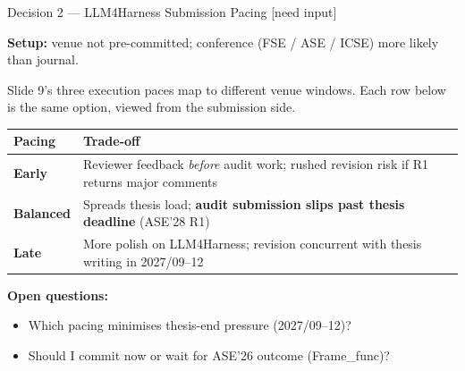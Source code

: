 \documentclass[aspectratio=169]{beamer}
\begin{document}
\begin{frame}{Decision 2 --- LLM4Harness Submission Pacing
\quad\textcolor{myred}{\small[need input]}}

\textbf{Setup:} venue not pre-committed; conference (FSE / ASE / ICSE) more likely than journal.

\smallskip
{\small\color{mygray}
Slide 9's three execution paces map to different venue windows.
Each row below is the same option, viewed from the submission side.}

\medskip
{\small\renewcommand{\arraystretch}{1.5}
\begin{tabular}{p{}p{}}
\toprule
\textbf{Pacing} & \textbf{Trade-off} \\
\midrule
\textbf{Early} &
Reviewer feedback \emph{before} audit work; rushed revision risk if R1 returns major comments \\
\textbf{Balanced} &
Spreads thesis load; \textbf{audit submission slips past thesis deadline} (ASE'28 R1) \\
\textbf{Late} &
More polish on LLM4Harness; revision concurrent with thesis writing in 2027/09--12 \\
\bottomrule
\end{tabular}}

\bigskip
\textbf{Open questions:}
\begin{itemize}\small
  \item Which pacing minimises thesis-end pressure (2027/09--12)?
  \item Should I commit now or wait for ASE'26 outcome (Frame\_func)?
\end{itemize}

\end{frame}
\end{document}
